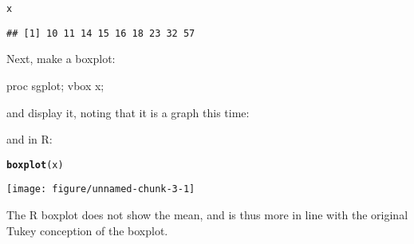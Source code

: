 \documentclass{article}\usepackage[]{graphicx}\usepackage[]{color}
\makeatletter
\def\maxwidth{ %
  \ifdim\Gin@nat@width>\linewidth
    \linewidth
  \else
    \Gin@nat@width
  \fi
}
\newcommand{\hlstd}[1]{\textcolor[rgb]{0.345,0.345,0.345}{#1}}%
\newcommand{\hlkwd}[1]{\textcolor[rgb]{0.737,0.353,0.396}{\textbf{#1}}}%
\newenvironment{kframe}{%
 \def\at@end@of@kframe{}%
 \ifinner\ifhmode%
  \def\at@end@of@kframe{\end{minipage}}%
  \begin{minipage}{\columnwidth}%
 \fi\fi%
 \def\FrameCommand##1{\hskip\@totalleftmargin \hskip-\fboxsep
 \colorbox{shadecolor}{##1}\hskip-\fboxsep
     \hskip-\linewidth \hskip-\@totalleftmargin \hskip\columnwidth}%
 \MakeFramed {\advance\hsize-\width
   \@totalleftmargin\z@ \linewidth\hsize
   \@setminipage}}%
 {\par\unskip\endMakeFramed%
 \at@end@of@kframe}
\newenvironment{knitrout}{}{} %
\makeatother
\begin{document}
\begin{knitrout}
\color{fgcolor}\begin{kframe}
\begin{alltt}
\hlstd{x}
\end{alltt}
\begin{verbatim}
## [1] 10 11 14 15 16 18 23 32 57
\end{verbatim}
\end{kframe}
\end{knitrout}

Next, make a boxplot:

\begin{Sascode}[store=b]
proc sgplot;
  vbox x;
\end{Sascode}

and display it, noting that it is a graph this time:


and in R:

\begin{knitrout}
\color{fgcolor}\begin{kframe}
\begin{alltt}
\hlkwd{boxplot}\hlstd{(x)}
\end{alltt}
\end{kframe}
\texttt{[image: figure/unnamed-chunk-3-1]} 

\end{knitrout}

The R boxplot does not show the mean, and is thus more in line with
the original Tukey conception of the boxplot.
\end{document}

